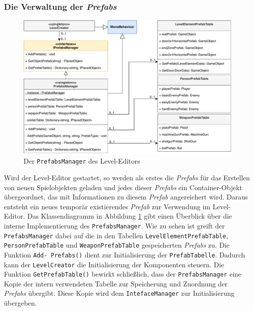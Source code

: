 \subsubsection{Die Verwaltung der \textit{Prefabs}}
\begin {figure}[h]
	\begin {center}
	    \includegraphics[width=1\textwidth]{pics/leveleditor_prefabsmanager.pdf}
		\caption{Der \texttt{PrefabsManager} des Level-Editors}
		\label{fig:prefabsmanager}
	\end {center}
\end {figure}

Wird der Level-Editor gestartet, so werden als erstes die \textit{Prefabs} für das Erstellen von neuen Spielobjekten geladen und jedes dieser \textit{Prefabs} ein Container-Objekt übergeordnet, das mit Informationen zu diesem \textit{Prefab} angereichert wird. Daraus entsteht ein neues temporär existierendes \textit{Prefab} zur Verwendung im Level-Editor. Das Klassendiagramm in Abbildung \ref{fig:prefabsmanager} gibt einen Überblick über die interne Implementierung des \texttt{PrefabsManager}. Wie zu sehen ist greift der \texttt{PrefabsManager} dabei auf die in den Tabellen \texttt{LevelElementPrefabTable}, \texttt{PersonPrefabTable} und \texttt{WeaponPrefabTable} gespeicherten \textit{Prefabs} zu. Die Funktion \texttt{Add- \linebreak Prefabs()} dient zur Initialisierung der \texttt{PrefabTabelle}. Dadurch kann der \texttt{LevelCreator} die Initialisierung der Komponenten steuern. Die Funktion \texttt{GetPrefabTable()} bewirkt schließlich, dass der \texttt{PrefabsManager} eine Kopie der intern verwendeten Tabelle zur Speicherung und Zuordnung der \textit{Prefabs} übergibt. Diese Kopie wird dem \texttt{IntefaceManager} zur Initialisierung übergeben. 

